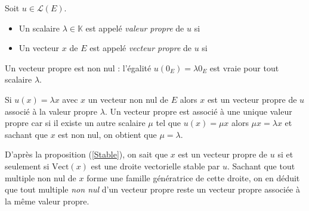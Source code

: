 \documentclass[a4paper,10pt]{report}
\begin{document}
\begin{defin} Soit $u \in \mathcal{L}(E)$.

\begin{itemize}
\item Un scalaire $\lambda \in \mathbb{K}$ est appelé \textit{valeur propre} de $u$ si \newline {}
\item Un vecteur $x$ de $E$ est appelé \textit{vecteur propre} de $u$ si \newline {}
\end{itemize}
\end{defin}

\medskip

\begin{att} Un vecteur propre est non nul : l'égalité $u(0_E) = \lambda 0_E$ est vraie pour tout scalaire $\lambda$.
\end{att}

\medskip

\begin{rems} 
\item Si $u(x) = \lambda x$ avec $x$ un vecteur non nul de $E$ alors $x$ est un vecteur propre de $u$ associé à la valeur propre $\lambda$. Un vecteur propre est associé à une unique valeur propre car si il existe un autre scalaire $\mu$ tel que $u(x)= \mu x$ alors $\mu x = \lambda x$ et sachant que $x$ est non nul, on obtient que $\mu = \lambda$.
\item D'après la proposition (\ref{Stable}), on sait que $x$ est un vecteur propre de $u$ si et seulement si $\textrm{Vect}(x)$ est une droite vectorielle stable par $u$. Sachant que tout multiple non nul de $x$ forme une famille génératrice de cette droite, on en déduit que tout multiple \textit{non nul} d'un vecteur propre reste un vecteur propre associée à la même valeur propre.
\end{rems}

\medskip
\end{document}
